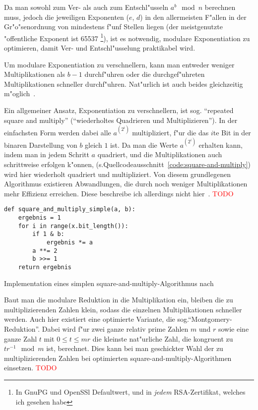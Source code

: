 \documentclass[12pt]{article}
\newcommand{\todo}[1]{\textcolor{red}{\mbox{TODO}}\marginpar{\textcolor{red}{#1}}}
\begin{document}
Da man sowohl zum Ver- als auch zum Entschl"usseln $a^b \mod n$ berechnen muss,
jedoch die jeweiligen Exponenten ($e$, $d$) in den allermeisten F"allen
in der Gr"o"senordnung von mindestens f"unf Stellen liegen
(der meistgenutzte "offentliche Exponent ist 65537%
\footnote{In GnuPG und OpenSSl Defaultwert,
und in \emph{jedem} RSA-Zertifikat, welches ich gesehen habe}),
ist es notwendig, modulare Exponentiation zu optimieren,
damit Ver- und Entschl"usselung praktikabel wird.

Um modulare Exponentiation zu verschnellern, kann man entweder weniger Multiplikationen
als $b-1$ durchf"uhren oder die durchgef"uhreten Multiplikationen schneller durchf"uhren.
Nat"urlich ist auch beides gleichzeitig m"oglich~\cite{hac}.

Ein allgemeiner Ansatz, Exponentiation zu verschnellern, ist sog.\@
"`repeated square and multiply"' ("`wiederholtes Quadrieren und Multiplizieren"').
In der einfachsten Form werden dabei alle $a^{(2^i)}$ multipliziert,
f"ur die das $i$te Bit in der binaren Darstellung von $b$ gleich $1$ ist.
Da man die Werte $a^{(2^i)}$ erhalten kann, indem man in jedem Schritt $a$ quadriert,
und die Multiplikationen auch schrittweise erfolgen k"onnen, (s.\@ Quellcodeausschnitt~\ref{code:square-and-multiply})
wird hier wiederholt quadriert und multipliziert.
Von diesem grundlegenen Algorithmus existieren Abwandlungen,
die durch noch weniger Multiplikationen mehr Effizienz erreichen.
Diese beschreibe ich allerdings nicht hier~\cite{hac}. \todo{Anhang?}

\begin{code-snip}
\begin{lstlisting}
def square_and_multiply_simple(a, b):
    ergebnis = 1
    for i in range(x.bit_length()):
        if 1 & b:
            ergebnis *= a
        a **= 2
        b >>= 1
    return ergebnis
\end{lstlisting}
\caption{Implementation eines simplen square-and-multiply-Algorithmus nach~\cite{hac}}
\label{code:square-and-multiply}
\end{code-snip}

Baut man die modulare Reduktion in die Multiplikation ein,
bleiben die zu multiplizierenden Zahlen klein, sodass die einzelnen
Multiplikationen schneller werden.
Auch hier existiert eine optimierte Variante, die sog.\@ "`Montgomery-Reduktion"'.
Dabei wird f"ur zwei ganze relativ prime Zahlen $m$ und $r$ sowie eine ganze Zahl $t$ mit $0 \leq t \le mr$
die kleinste nat"urliche Zahl, die kongruent zu $tr^{-1} \mod m$ ist, berechnet.
Dies kann bei man geschickter Wahl der zu multiplizierenden Zahlen
bei optimierten square-and-multiply-Algorithmen einsetzen.
\todo{Genau wie? Braucht aber ltr-algo}
\end{document}
